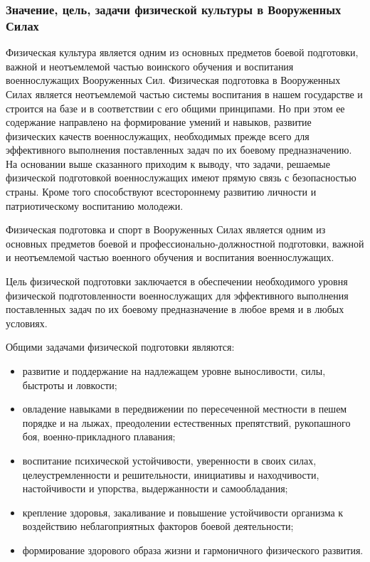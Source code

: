\documentclass[a4paper]{article}
\begin{document}
    \subsubsection{Значение, цель, задачи физической культуры в Вооруженных Силах}

    Физическая культура является одним из основных предметов боевой подготовки, важной и неотъемлемой частью воинского обучения и воспитания военнослужащих Вооруженных Сил. Физическая подготовка в Вооруженных Силах является неотъемлемой частью системы воспитания в нашем государстве и строится на базе и в соответствии с его общими принципами. Но при этом ее содержание направлено на формирование умений и навыков, развитие физических качеств военнослужащих, необходимых прежде всего для эффективного выполнения поставленных задач по их боевому предназначению. На основании выше сказанного приходим к выводу, что задачи, решаемые физической подготовкой военнослужащих имеют прямую связь с безопасностью страны. Кроме того способствуют всестороннему развитию личности и патриотическому воспитанию молодежи.

    Физическая подготовка и спорт в Вооруженных Силах является одним из основных предметов боевой и профессионально-должностной подготовки, важной и неотъемлемой частью военного обучения и воспитания военнослужащих.

    Цель физической подготовки заключается в обеспечении необходимого уровня физической подготовленности военнослужащих для эффективного выполнения поставленных задач по их боевому предназначение в любое время и в любых условиях.

    Общими задачами физической подготовки являются:

    \begin{itemize}
        \item развитие и поддержание на надлежащем уровне выносливости, силы, быстроты и ловкости;
        \item овладение навыками в передвижении по пересеченной местности в пешем порядке и на лыжах, преодолении естественных препятствий, рукопашного боя, военно-прикладного плавания;
        \item воспитание психической устойчивости, уверенности в своих силах, целеустремленности и решительности, инициативы и находчивости, настойчивости и упорства, выдержанности и самообладания;
        \item крепление здоровья, закаливание и повышение устойчивости организма к воздействию неблагоприятных факторов боевой деятельности;
        \item формирование здорового образа жизни и гармоничного физического развития.
    \end{itemize}
\end{document}
